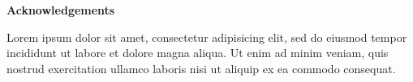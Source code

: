 
\clearpage
\begin{adjustwidth}{0.1\textwidth}{0.1\textwidth}
\begingroup
\null\vspace{0.2\textheight}
\begin{center}
{\bfseries\Large Acknowledgements}\par\vspace{2em}

Lorem ipsum dolor sit amet, consectetur adipisicing elit, sed do eiusmod tempor incididunt ut labore et dolore magna aliqua. Ut enim ad minim veniam, quis nostrud exercitation ullamco laboris nisi ut aliquip ex ea commodo consequat.
\end{center}
\endgroup
\end{adjustwidth}
\clearpage